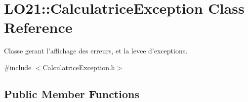 \hypertarget{class_l_o21_1_1_calculatrice_exception}{\section{\-L\-O21\-:\-:\-Calculatrice\-Exception \-Class \-Reference}
\label{class_l_o21_1_1_calculatrice_exception}
}


\-Classe gerant l'affichage des erreurs, et la levee d'exceptions.  




{\ttfamily \#include $<$\-Calculatrice\-Exception.\-h$>$}

\subsection*{\-Public \-Member \-Functions}
